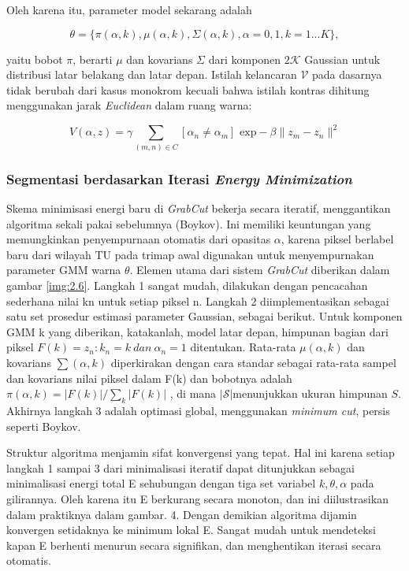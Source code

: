 Oleh karena itu, parameter model sekarang adalah 

\begin{equation} \label{eq:rumus_energi3}
  \theta = \{ \pi(\alpha, k), \mu (\alpha, k), \Sigma (\alpha, k), \alpha = 0,1, k = 1...K \},
\end{equation}  

yaitu bobot \(\pi\), berarti \(\mu\) dan kovarians \(\Sigma\) dari komponen \(\mathcal{2K} \)
Gaussian untuk distribusi latar belakang dan latar depan. Istilah kelancaran \(\mathcal{V}\) 
pada dasarnya tidak berubah dari kasus monokrom kecuali bahwa istilah kontras dihitung 
menggunakan jarak \emph{Euclidean} dalam ruang warna: 

\begin{equation} \label{eq:rumus_energi4}
  V(\alpha, z) = \gamma \sum_{(m,n)\in C} [\alpha_{n} \neq \alpha_{m}] \textrm{ exp} - \beta \|z_{m} - z_{n}\|^2
\end{equation}


\subsubsection{{Segmentasi berdasarkan Iterasi \emph{Energy Minimization}}}


Skema minimisasi energi baru di \emph{GrabCut} bekerja secara iteratif, menggantikan algoritma 
sekali pakai sebelumnya (Boykov). Ini memiliki keuntungan yang memungkinkan 
penyempurnaan otomatis dari opasitas \(\alpha\), karena piksel berlabel baru dari 
wilayah TU pada trimap awal digunakan untuk menyempurnakan parameter GMM warna \( \theta \). 
Elemen utama dari sistem \emph{GrabCut} diberikan dalam gambar \ref{img:2.6}. Langkah 1 sangat mudah, 
dilakukan dengan pencacahan sederhana nilai kn untuk setiap piksel n. Langkah 2 
diimplementasikan sebagai satu set prosedur estimasi parameter Gaussian, sebagai 
berikut. Untuk komponen GMM k yang diberikan, katakanlah, model latar depan, himpunan 
bagian dari piksel \(F(k) = {z_{n} : k_{n} = k \: dan \: \alpha_{n} = 1}\) ditentukan. 
Rata-rata \(\mu(\alpha, k)\) dan kovarians \(\sum(\alpha, k)\) diperkirakan dengan 
cara standar sebagai rata-rata sampel dan kovarians nilai piksel dalam F(k) dan 
bobotnya adalah \(\pi(\alpha, k)= |F( k)|/\sum_{k} |F(k)|\) , di mana \(\mathcal{|S|} \)menunjukkan 
ukuran himpunan \(S\). Akhirnya langkah 3 adalah optimasi global, menggunakan \emph{minimum cut}, 
persis seperti Boykov.


Struktur algoritma menjamin sifat konvergensi yang tepat. Hal ini karena setiap 
langkah 1 sampai 3 dari minimalisasi iteratif dapat ditunjukkan sebagai minimalisasi 
energi total E sehubungan dengan tiga set variabel \(k, \theta, \alpha\) pada gilirannya. Oleh 
karena itu E berkurang secara monoton, dan ini diilustrasikan dalam praktiknya 
dalam gambar. 4. Dengan demikian algoritma dijamin konvergen setidaknya ke minimum 
lokal E. Sangat mudah untuk mendeteksi kapan E berhenti menurun secara signifikan, 
dan menghentikan iterasi secara otomatis. 



